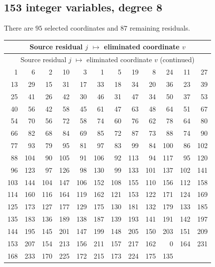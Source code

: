 \subsection{153 integer variables, degree 8}
There are $95$ selected coordinates and $87$ remaining residuals.
\begingroup
\small
\setlength{\tabcolsep}{4pt}
\begin{longtable}{*{6}{r@{\,$\mapsto$\,}r}}
\hline
\multicolumn{12}{c}{Source residual $j$ $\mapsto$ eliminated coordinate $v$}\\
\hline
\endfirsthead
\hline
\multicolumn{12}{c}{Source residual $j$ $\mapsto$ eliminated coordinate $v$ (continued)}\\
\hline
\endhead
1 & 6 & 2 & 10 & 3 & 1 & 5 & 19 & 8 & 24 & 11 & 27 \\
13 & 29 & 15 & 31 & 17 & 33 & 18 & 34 & 20 & 36 & 23 & 39 \\
25 & 41 & 26 & 42 & 30 & 46 & 31 & 47 & 34 & 50 & 37 & 53 \\
40 & 56 & 42 & 58 & 45 & 61 & 47 & 63 & 48 & 64 & 51 & 67 \\
54 & 70 & 56 & 72 & 58 & 74 & 60 & 76 & 62 & 78 & 64 & 80 \\
66 & 82 & 68 & 84 & 69 & 85 & 72 & 87 & 73 & 88 & 74 & 90 \\
77 & 93 & 79 & 95 & 81 & 97 & 83 & 99 & 84 & 100 & 86 & 102 \\
88 & 104 & 90 & 105 & 91 & 106 & 92 & 113 & 94 & 117 & 95 & 120 \\
96 & 123 & 97 & 126 & 98 & 130 & 99 & 133 & 101 & 137 & 102 & 141 \\
103 & 144 & 104 & 147 & 106 & 152 & 108 & 155 & 110 & 156 & 112 & 158 \\
114 & 160 & 116 & 164 & 119 & 162 & 121 & 153 & 122 & 171 & 124 & 169 \\
125 & 173 & 127 & 177 & 129 & 175 & 130 & 181 & 132 & 179 & 133 & 185 \\
135 & 183 & 136 & 189 & 138 & 187 & 139 & 193 & 141 & 191 & 142 & 197 \\
144 & 195 & 145 & 201 & 147 & 199 & 148 & 205 & 150 & 203 & 151 & 209 \\
153 & 207 & 154 & 213 & 156 & 211 & 157 & 217 & 162 & 0 & 164 & 231 \\
168 & 233 & 170 & 225 & 172 & 215 & 173 & 224 & 175 & 135 & \multicolumn{2}{c}{} \\
\hline
\end{longtable}
\endgroup

